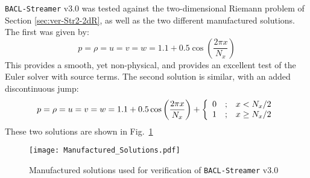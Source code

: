 {\tt BACL-Streamer} v3.0 was tested against the two-dimensional Riemann problem of Section \ref{sec:ver-Str2-2dR}, as well as the two different manufactured solutions. The first was given by:
\[p = \rho  = u = v = w = 1.1 + 0.5\cos \left( {\frac{{2\pi x}}{{{N_x}}}} \right)\]
This provides a smooth, yet non-physical, and provides an excellent test of the Euler solver with source terms. The second solution is similar, with an added discontinuous jump:
\[p = \rho  = u = v = w = 1.1 + 0.5\cos \left( {\frac{{2\pi x}}{{{N_x}}}} \right) + \left\{ {\begin{array}{*{20}{c}}
0&;&{x < {{{N_x}} \mathord{\left/
 {\vphantom {{{N_x}} 2}} \right.
 \kern-\nulldelimiterspace} 2}}\\
1&;&{x \ge {{{N_x}} \mathord{\left/
 {\vphantom {{{N_x}} 2}} \right.
 \kern-\nulldelimiterspace} 2}}
\end{array}} \right.\]
These two solutions are shown in Fig.~\ref{fig:manufactured-solutions}
\begin{figure}[p]
\label{fig:manufactured-solutions}
\centering
\texttt{[image: Manufactured\_Solutions.pdf]}
\caption{Manufactured solutions used for verification of {\tt BACL-Streamer} v3.0}
\end{figure}

